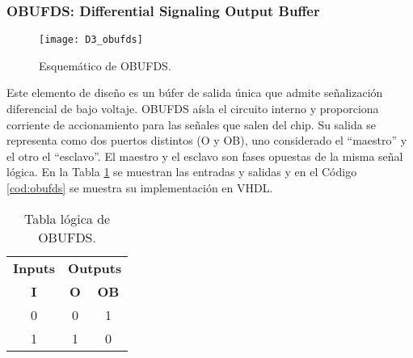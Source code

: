                 \vspace{0.4cm}
                

            \subsubsection{OBUFDS: Differential Signaling Output Buffer}

                \begin{figure}[hbtp]
                    \caption{Esquemático de OBUFDS.}
                    \centering
                    \texttt{[image: D3\_obufds]}
                    \label{fig:D3_obufds}
                \end{figure}	

                Este elemento de diseño es un búfer de salida única que admite señalización diferencial de bajo voltaje. OBUFDS aísla el circuito interno y proporciona corriente de accionamiento para las señales que salen del chip. Su salida se representa como dos puertos distintos (O y OB), uno considerado el ``maestro'' y el otro el ``esclavo''. El maestro y el esclavo son fases opuestas de la misma señal lógica.  En la Tabla \ref{tab:obufds} se muestran las entradas y salidas y en el Código \ref{cod:obufds} se muestra su implementación en VHDL.
                
                \begin{table}[htbp]
                    \centering
                    \caption{Tabla lógica de OBUFDS.}
                    \begin{tabular}{|c|cc|}
                        \hline
                        \textbf{Inputs} & \multicolumn{2}{c|}{\textbf{Outputs}} \\ 
                        \textbf{I}      & \multicolumn{1}{c}{\textbf{O}}  & \textbf{OB} \\ 
                        \hline
                        0      & \multicolumn{1}{c|}{0}  & 1  \\ \hline
                        1      & \multicolumn{1}{c|}{1}  & 0  \\ \hline
                    \end{tabular}
                    \label{tab:obufds}
                \end{table}

